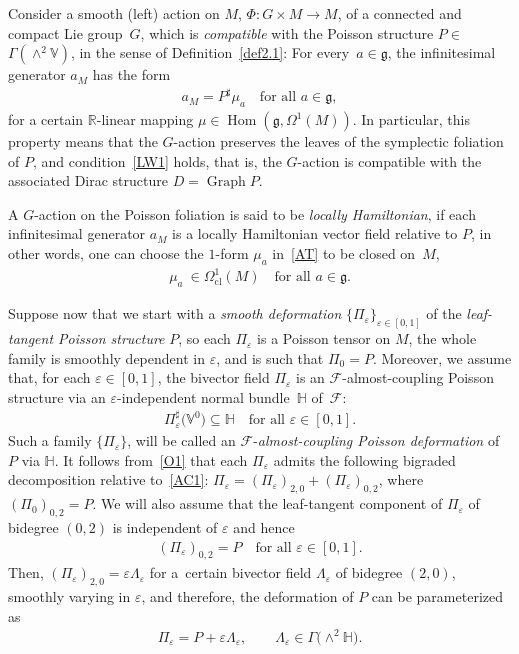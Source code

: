 \documentclass[pdftex]{sigma}
\numberwithin{equation}{section}
\begin{document}
Consider a smooth (left) action on $M$, $\Phi\colon G\times M\rightarrow M$, of a connected and compact Lie group~$G$, which is \emph{compatible} with the Poisson structure $P\in$ $\Gamma(\wedge ^{2}\mathbb{V})$, in the sense of Def\/inition~\ref{def2.1}: For every~$a\in\mathfrak{g}$, the inf\/initesimal generator $a_{M}$ has the form
\begin{gather}\label{AT}
a_{M}=P^{\sharp} \mu_{a}\quad \mbox{for all }a\in\mathfrak{g},
\end{gather}
for a certain $\mathbb{R}$-linear mapping $\mu\in\operatorname*{Hom}(\mathfrak{g},\Omega^{1}(M))$. In particular, this property means that the
$G$-action preserves the leaves of the symplectic foliation of $P$, and condition~\eqref{LW1} holds, that is, the $G$-action is compatible with the
associated Dirac structure $D=\operatorname*{Graph}P$.

A $G$-action on the Poisson foliation is said to be \emph{locally Hamiltonian}, if each inf\/initesimal generator $a_{M}$ is a locally Hamiltonian
vector f\/ield relative to $P$, in other words, one can choose the $1$-form $\mu_{a}$ in~\eqref{AT} to be closed on~$M$,
\begin{gather}\label{LH}%
\mu_{a}\ \in\Omega_{\operatorname*{cl}}^{1}(M)\quad \mbox{for all }a\in\mathfrak{g}.
\end{gather}

Suppose now that we start with a \emph{smooth deformation} $\{\Pi_\varepsilon\}_{\varepsilon\in [0,1]}$ of the \emph{leaf-tangent Poisson structure} $P$, so each $\Pi_{\varepsilon}$ is a Poisson tensor on $M$, the whole family is smoothly dependent in $\varepsilon$, and is such that $\Pi_{0}=P$. Moreover, we assume that, for each $\varepsilon\in [0,1]$, the bivector f\/ield $\Pi_{\varepsilon}$ is an $\mathcal{F}$-almost-coupling Poisson structure via an $\varepsilon$-independent normal bundle~$\mathbb{H}$ of~$\mathcal{F}$:
\begin{gather}\label{O1}
\Pi_{\varepsilon}^{\sharp}\big(\mathbb{V}^{0}\big)\subseteq\mathbb{H}\quad \mbox{for all }\varepsilon\in [0,1].
\end{gather}
Such a family $\{\Pi_{\varepsilon}\}$, will be called an $\mathcal{F}$-\emph{almost-coupling Poisson deformation} of $P$ via $\mathbb{H}$. It
follows from~\eqref{O1} that each $\Pi_{\varepsilon}$ admits the following bigraded decomposition relative to~\eqref{AC1}: $\Pi_{\varepsilon}=(\Pi_{\varepsilon})_{2,0}+(\Pi_{\varepsilon})_{0,2}$, where $(\Pi_0)_{0,2}=P$. We will also assume that the leaf-tangent component of $\Pi_{\varepsilon}$ of bidegree $(0,2)$ is independent of $\varepsilon$ and hence
\begin{gather*}%
(\Pi_{\varepsilon})_{0,2}=P\quad \mbox{for all }\varepsilon\in [0,1].
\end{gather*}
Then, $(\Pi_{\varepsilon})_{2,0}=\varepsilon\Lambda_{\varepsilon}$ for a~certain bivector f\/ield $\Lambda_{\varepsilon}$ of bidegree $(2,0)$, smoothly varying in $\varepsilon$, and therefore, the deformation of $P$ can be parameterized as
\begin{gather}\label{SD2}
\Pi_{\varepsilon}=P+\varepsilon\Lambda_{\varepsilon},\qquad \Lambda_{\varepsilon}\in\Gamma\big({\wedge}^{2}\mathbb{H}\big).
\end{gather}
\end{document}
